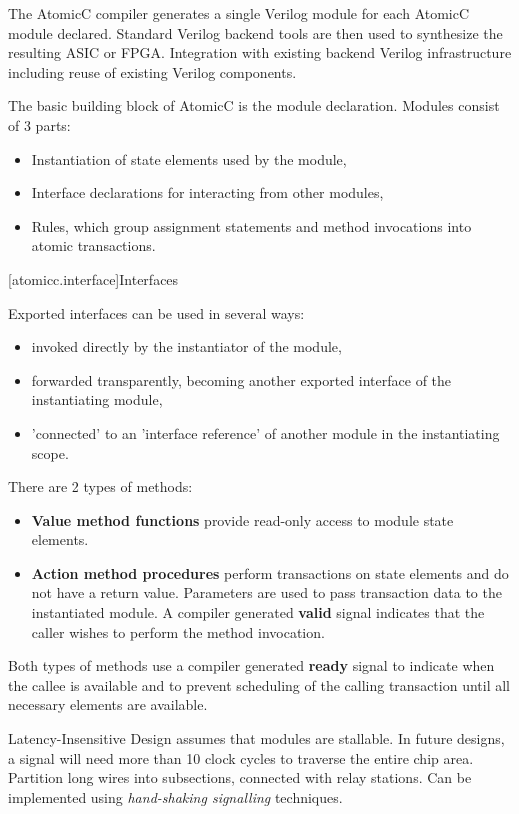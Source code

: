 The AtomicC compiler 
generates a single Verilog module for each AtomicC module declared.
Standard Verilog backend tools are then used to synthesize
the resulting ASIC or FPGA.
Integration with existing backend Verilog infrastructure including reuse of existing Verilog
components.

The basic building block of AtomicC is the module declaration.
Modules consist of 3 parts:
\begin{itemize}
\item Instantiation of state elements used by the module,
\item Interface declarations for interacting from other modules,
\item Rules, which group assignment statements and method invocations into atomic transactions.
\end{itemize}

[atomicc.interface]{Interfaces}

Exported interfaces can be used in several ways:
\begin{itemize}
\item invoked directly by the instantiator of the module,
\item forwarded transparently, becoming another exported interface of the instantiating module,
\item 'connected' to an 'interface reference' of another module in the instantiating scope.
\end{itemize}

There are 2 types of methods:
\begin{itemize}
\item \textbf{Value method functions} provide read-only access to module state elements.
\item \textbf{Action method procedures} perform transactions on state elements
and do not have a return value.
Parameters are used to pass transaction data to the instantiated module.
A compiler generated
\textbf{valid} signal indicates that the caller wishes to perform the method invocation.
\end{itemize}

Both types of methods use a compiler generated \textbf{ready} signal
to indicate when the callee is available and
to prevent scheduling of the calling transaction until all necessary elements are
available.

Latency-Insensitive Design assumes that modules are stallable.
In future designs, a signal will need more than 10 clock cycles
to traverse the entire chip area.  Partition long wires into
subsections, connected with relay stations.
Can be implemented using \textit{hand-shaking signalling} techniques.

